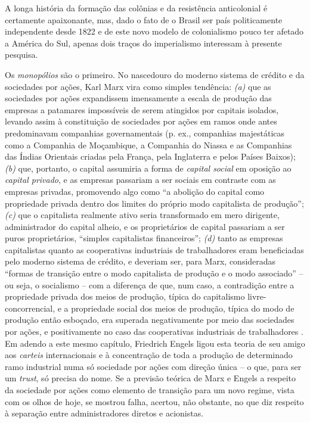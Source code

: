 A longa história da formação das colônias e da resistência anticolonial é certamente apaixonante, mas, dado o fato de o Brasil ser país politicamente independente desde 1822 e de este novo modelo de colonialismo pouco ter afetado a América do Sul, apenas dois traços do imperialismo interessam à presente pesquisa.

Os \textit{monopólios} são o primeiro. No nascedouro do moderno sistema de crédito e da sociedades por ações, Karl Marx vira como simples tendência: \textit{(a)} que as sociedades por ações expandissem imensamente a escala de produção das empresas a patamares impossíveis de serem atingidos por capitais isolados, levando assim à constituição de sociedades por ações em ramos onde antes predominavam companhias governamentais (p. ex., companhias majestáticas como a Companhia de Moçambique, a Companhia do Niassa e as Companhias das Índias Orientais criadas pela França, pela Inglaterra e pelos Países Baixos); \textit{(b)} que, portanto, o capital assumiria a forma de \textit{capital social} em oposição ao \textit{capital privado}, e as empresas passariam a ser sociais em contraste com as empresas privadas, promovendo algo como ``a abolição do capital como propriedade privada dentro dos limites do próprio modo capitalista de produção''; \textit{(c)} que o capitalista realmente ativo seria transformado em mero dirigente, administrador do capital alheio, e os proprietários de capital passariam a ser puros proprietários, ``simples capitalistas financeiros''; \textit{(d)} tanto as empresas capitalistas quanto as cooperativas industriais de trabalhadores eram beneficiadas pelo moderno sistema de crédito, e deveriam ser, para Marx, consideradas ``formas de transição entre o modo capitalista de produção e o modo associado'' -- ou seja, o socialismo -- com a diferença de que, num caso, a contradição entre a propriedade privada dos meios de produção, típica do capitalismo livre-concorrencial, e a propriedade social dos meios de produção, típica do modo de produção então esboçado, era superada negativamente por meio das sociedades por ações, e positivamente no caso das cooperativas industriais de trabalhadores \cite[p.~581-588]{MARX2008a}. Em adendo a este mesmo capítulo, Friedrich Engels ligou esta teoria de seu amigo aos \textit{carteis} internacionais e à concentração de toda a produção de determinado ramo industrial numa só sociedade por ações com direção única \cite[p.~584]{MARX2008a} -- o que, para ser um \textit{trust}, só precisa do nome. Se a previsão teórica de Marx e Engels a respeito da sociedade por ações como elemento de transição para um novo regime, vista com os olhos de hoje, se mostrou falha, acertou, não obstante, no que diz respeito à separação entre administradores diretos e acionistas. 

